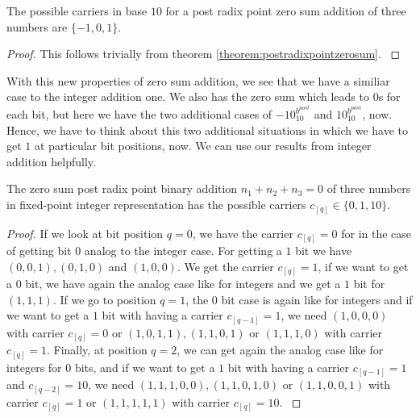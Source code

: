 \begin{theorem}
    The possible carriers in base $10$ for a post radix point zero sum addition of three numbers are $\{-1, 0, 1\}$.
\label{theorem:postradixpointadditioncarriers}
\end{theorem}

\begin{proof}
    This follows trivially from theorem \ref{theorem:postradixpointzerosum}.
\label{proof:postradixpointaddtioncarriers}
\end{proof}

With this new properties of zero sum addition, we see that we have a similiar case to the integer addition one. We also has the zero sum which leads to $0$s for each bit, but here we have the two additional cases of $-10^{b^{post}}_{10}$ and $10^{b^{post}}_{10}$, now. Hence, we have to think about this two additional situations in which we have to get $1$ at particular bit positions, now. We can use our results from integer addition helpfully.


\begin{theorem}[Carriers $c_{[q]}$]
    The zero sum post radix point binary addition $n_{1} + n_{2} + n_{3} = 0$ of three numbers in fixed-point integer representation has the possible carriers $c_{[q]} \in \{0,1,10\}$.
\label{theorem:carriers_fixedpointinteger}
\end{theorem}


\begin{proof}
    If we look at bit position $q = 0$, we have the carrier $c_{[q]} = 0$ for in the case of getting bit $0$ analog to the integer case. For getting a $1$ bit we have $\left(0,0,1\right), \left(0,1,0\right)$ and $\left(1,0,0\right)$. We get the carrier $c_{[q]} = 1$, if we want to get a $0$ bit, we have again the analog case like for integers and we get a $1$ bit for $\left(1,1,1\right)$. If we go to position $q = 1$, the $0$ bit case is again like for integers and if we want to get a $1$ bit with having a carrier $c_{[q-1]} = 1$, we need $\left(1,0,0,0\right)$ with carrier $c_{[q]} = 0$ or $\left(1,0,1,1\right), \left(1,1,0,1\right)$ or $\left(1,1,1,0\right)$ with carrier $c_{[q]} = 1$. Finally, at position $q = 2$, we can get again the analog case like for integers for $0$ bits, and if we want to get a $1$ bit with having a carrier $c_{[q-1]} = 1$ and $c_{[q-2]} = 10$, we need $\left(1,1,1,0,0\right), \left(1,1,0,1,0\right)$ or $\left(1,1,0,0,1\right)$ with carrier $c_{[q]} = 1$ or $\left(1,1,1,1,1\right)$ with carrier $c_{[q]} = 10$.
\label{proof:carriers_fixedpointinteger}
\end{proof}


